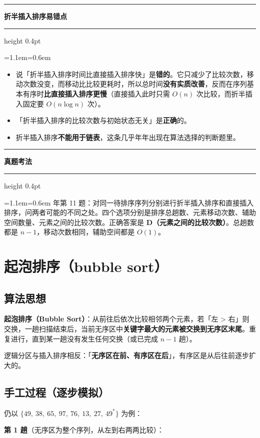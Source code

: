 \documentclass[11pt,openany,UTF8]{ctexbook}
\newcommand{\callouthead}[2]{%
  \par\addvspace{7pt}\noindent
  {\color{#1}\rule[-0.15em]{3pt}{1.05em}}\hspace{0.5em}%
  {\bfseries\color{#1}#2}\par\nobreak\vspace{-0.35em}%
  {\color{rulesep}\hrule height 0.4pt}\nobreak\vspace{0.45em}%
  \begingroup\small\setlength{\parindent}{0pt}%
  \leftskip=1.1em\rightskip=0.6em\noindent\ignorespaces}
\newcommand{\calloutend}{\par\endgroup\addvspace{7pt}}
\newenvironment{callwarn}[1]{\callouthead{warnbar}{#1}}{\calloutend}
\newenvironment{callexam}[1]{\callouthead{exambar}{#1}}{\calloutend}
\begin{document}
\begin{callwarn}{折半插入排序易错点}
\begin{itemize}
\item 说「折半插入排序时间比直接插入排序快」是\textbf{错的}。它只减少了比较次数，移动次数没变，而移动比比较更耗时，所以总时间\textbf{没有实质改善}，反而在序列基本有序时\textbf{比直接插入排序更慢}（直接插入此时只需 $O(n)$ 次比较，而折半插入固定要 $O(n\log n)$ 次）。
\item 「折半插入排序的比较次数与初始状态无关」是\textbf{正确}的。
\item 折半插入排序\textbf{不能用于链表}，这条几乎年年出现在算法选择的判断题里。
\end{itemize}
\end{callwarn}

\begin{callexam}{真题考法}
2012 年第 11 题：对同一待排序序列分别进行折半插入排序和直接插入排序，问两者可能的不同之处。四个选项分别是排序总趟数、元素移动次数、辅助空间数量、元素之间的比较次数。正确答案是 \textbf{D（元素之间的比较次数）}。总趟数都是 $n-1$，移动次数相同，辅助空间都是 $O(1)$。

\end{callexam}

\section{起泡排序（bubble sort）}

\subsection{算法思想}

\textbf{起泡排序（Bubble Sort）}：从前往后依次比较相邻两个元素，若「左 > 右」则交换，一趟扫描结束后，当前无序区中\textbf{关键字最大的元素被交换到无序区末尾}。重复进行，直到某一趟没有发生任何交换（或已完成 $n-1$ 趟）。

逻辑分区与插入排序相反：「\textbf{无序区在前、有序区在后}」，有序区是从后往前逐步扩大的。

\subsection{手工过程（逐步模拟）}

仍以 $\{49,\ 38,\ 65,\ 97,\ 76,\ 13,\ 27,\ 49^*\}$ 为例：

\textbf{第 1 趟}（无序区为整个序列，从左到右两两比较）：
\end{document}
